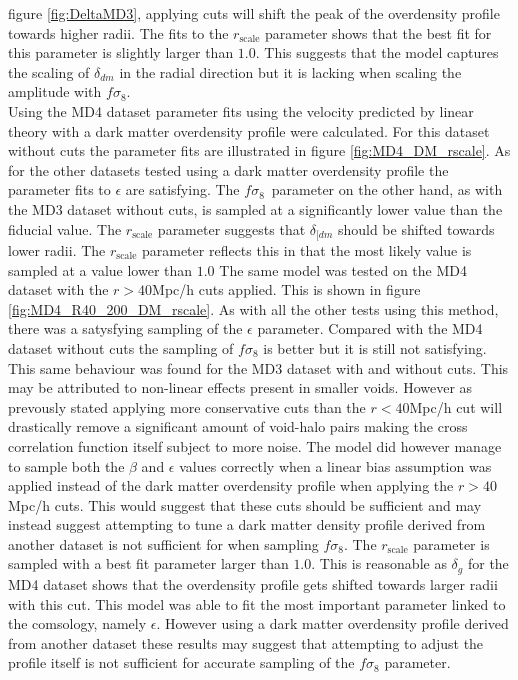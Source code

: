 figure \ref{fig:DeltaMD3}, applying cuts will shift the peak of the overdensity profile towards higher radii. The fits to the $r_{\mathrm{scale}}$ parameter shows that the best fit for this parameter is slightly larger than $1.0$. This suggests that the model captures the scaling of $\delta_{dm}$ in the radial direction but it is lacking when scaling the amplitude with $f\sigma_8$.\\\indent
Using the MD4 dataset parameter fits using the velocity predicted by linear theory with a dark matter overdensity profile were calculated. For this dataset without cuts the parameter fits are illustrated in figure \ref{fig:MD4_DM_rscale}. As for the other datasets tested using a dark matter overdensity profile the parameter fits to $\epsilon$ are satisfying. The $f\sigma_8$ parameter on the other hand, as with the MD3 dataset without cuts, is sampled at a significantly lower value than the fiducial value. The $r_{\mathrm{scale}}$ parameter suggests that $\delta_{\mathrm[{dm}}$ should be shifted towards lower radii. The $r_{\mathrm{scale}}$ parameter reflects this in that the most likely value is sampled at a value lower than $1.0$ The same model was tested on the MD4 dataset with the $r>40$Mpc/h cuts applied. This is shown in figure \ref{fig:MD4_R40_200_DM_rscale}. As with all the other tests using this method, there was a satysfying sampling of the  $\epsilon$ parameter. Compared with the MD4 dataset without cuts the sampling of $f\sigma_8$ is better but it is still not satisfying. This same behaviour was found for the MD3 dataset with and without cuts. This may be attributed to non-linear effects present in smaller voids. However as prevously stated applying more conservative cuts than the $r<40$Mpc/h cut will drastically remove a significant amount of void-halo pairs making the cross correlation function itself subject to more noise. The model did however manage to sample both the $\beta$ and $\epsilon$ values correctly when a linear bias assumption was applied instead of the dark matter overdensity profile when applying the $r>40$Mpc/h cuts. This would suggest that these cuts should be sufficient and may instead suggest attempting to tune a dark matter density profile derived from another dataset is not sufficient for when sampling $f\sigma_8$. The $r_\mathrm{scale}$ parameter is sampled with a best fit parameter larger than $1.0$. This is reasonable as $\delta_g$ for the MD4 dataset shows that the overdensity profile gets shifted towards larger radii with this cut. This model was able to fit the most important parameter linked to the comsology, namely $\epsilon$. However using a dark matter overdensity profile derived from another dataset these results may suggest that attempting to adjust the profile itself is not sufficient for accurate sampling of the $f\sigma_8$ parameter.

